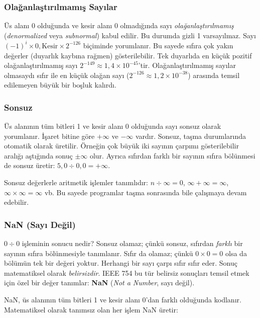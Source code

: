 \subsubsection{Olağanlaştırılmamış Sayılar}

Üs alanı 0 olduğunda ve kesir alanı 0 olmadığında sayı \emph{olağanlaştırılmamış} (\emph{denormalized} veya \emph{subnormal}) kabul edilir. Bu durumda gizli 1 varsayılmaz. Sayı $(-1)^i \times 0{,}\text{Kesir} \times 2^{-126}$ biçiminde yorumlanır. Bu sayede sıfıra çok yakın değerler (duyarlık kaybına rağmen) gösterilebilir. Tek duyarlıda en küçük pozitif olağanlaştırılmamış sayı $2^{-149} \approx 1{,}4 \times 10^{-45}$'tir. Olağanlaştırılmamış sayılar olmasaydı sıfır ile en küçük olağan sayı ($2^{-126} \approx 1{,}2 \times 10^{-38}$) arasında temsil edilemeyen büyük bir boşluk kalırdı.

\subsubsection{Sonsuz}

Üs alanının tüm bitleri 1 ve kesir alanı 0 olduğunda sayı sonsuz olarak yorumlanır. İşaret bitine göre $+\infty$ ve $-\infty$ vardır. Sonsuz, taşma durumlarında otomatik olarak üretilir. Örneğin çok büyük iki sayının çarpımı gösterilebilir aralığı aştığında sonuç $\pm\infty$ olur. Ayrıca sıfırdan farklı bir sayının sıfıra bölünmesi de sonsuz üretir: $5{,}0 \div 0{,}0 = +\infty$.

Sonsuz değerlerle aritmetik işlemler tanımlıdır: $n \div \infty = 0$, $\infty + \infty = \infty$, $\infty \times \infty = \infty$ vb. Bu sayede programlar taşma sonrasında bile çalışmaya devam edebilir.

\subsubsection{NaN (Sayı Değil)}

$0 \div 0$ işleminin sonucu nedir? Sonsuz olamaz; çünkü sonsuz, sıfırdan \emph{farklı} bir sayının sıfıra bölünmesiyle tanımlanır. Sıfır da olamaz; çünkü $0 \times 0 = 0$ olsa da bölümün tek bir değeri yoktur. Herhangi bir sayı çarpı sıfır sıfır eder. Sonuç matematiksel olarak \emph{belirsizdir}. IEEE 754 bu tür belirsiz sonuçları temsil etmek için özel bir değer tanımlar: \textbf{NaN} (\emph{Not a Number}, sayı değil).

NaN, üs alanının tüm bitleri 1 ve kesir alanı 0'dan farklı olduğunda kodlanır. Matematiksel olarak tanımsız olan her işlem NaN üretir:


